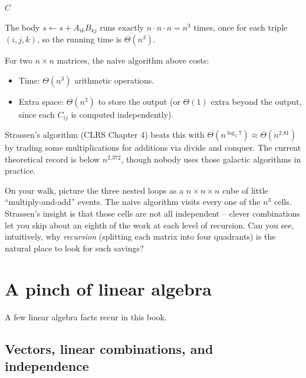 \begin{algorithm}[H]
\caption{Naive square matrix multiplication}
\Return $C$\;
\end{algorithm}

The body $s \leftarrow s + A_{ik} B_{kj}$ runs exactly $n \cdot n \cdot n = n^3$
times, once for each triple $(i,j,k)$, so the running time is $\Theta(n^3)$.

\begin{complexitybox}
For two $n \times n$ matrices, the naive algorithm above costs:
\begin{itemize}
  \item Time: $\Theta(n^3)$ arithmetic operations.
  \item Extra space: $\Theta(n^2)$ to store the output (or $\Theta(1)$ extra
        beyond the output, since each $C_{ij}$ is computed independently).
\end{itemize}
Strassen's algorithm (CLRS Chapter 4) beats this with $\Theta(n^{\log_2 7})
\approx \Theta(n^{2.81})$ by trading some multiplications for additions via
divide and conquer. The current theoretical record is below $n^{2.372}$, though
nobody uses those galactic algorithms in practice.
\end{complexitybox}

\begin{walkbox}
On your walk, picture the three nested loops as a $n \times n \times n$ cube of
little ``multiply-and-add'' events. The naive algorithm visits every one of the
$n^3$ cells. Strassen's insight is that those cells are not all independent --
clever combinations let you skip about an eighth of the work at each level of
recursion. Can you see, intuitively, why \emph{recursion} (splitting each matrix
into four quadrants) is the natural place to look for such savings?
\end{walkbox}

\section{A pinch of linear algebra}
\label{ch39:linalg}

A few linear algebra facts recur in this book.

\subsection{Vectors, linear combinations, and independence}


